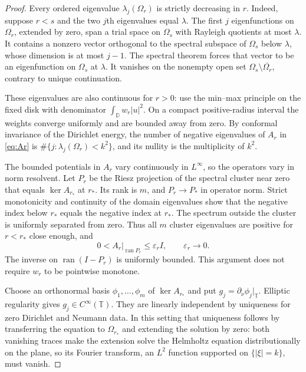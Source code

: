 \documentclass[11pt]{amsart}
\numberwithin{equation}{section}
\newcommand{\D}{\mathbb D}
\newcommand{\T}{\mathbb T}
\newcommand{\Id}{I}
\newcommand{\ran}{\operatorname{ran}}
\begin{document}
\begin{proof}
Every ordered eigenvalue $\lambda_j(\Omega_r)$ is strictly decreasing
in $r$. Indeed, suppose $r<s$ and the two $j$th eigenvalues equal
$\lambda$. The first $j$ eigenfunctions on $\Omega_r$, extended by
zero, span a trial space on $\Omega_s$ with Rayleigh quotients at
most $\lambda$. It contains a nonzero vector orthogonal to the
spectral subspace of $\Omega_s$ below $\lambda$, whose dimension is
at most $j-1$. The spectral theorem forces that vector to be an
eigenfunction on $\Omega_s$ at $\lambda$. It vanishes on the
nonempty open set $\Omega_s\setminus\overline{\Omega_r}$,
contrary to unique continuation.

These eigenvalues are also continuous for $r>0$: use the min--max
principle on the fixed disk with denominator
$\int_\D w_r|u|^2$. On a compact positive-radius interval the
weights converge uniformly and are bounded away from zero.
By conformal invariance of the Dirichlet energy, the number of
negative eigenvalues of $A_r$ in \eqref{eq:Ar} is
$\#\{j:\lambda_j(\Omega_r)<k^2\}$, and its nullity is the
multiplicity of $k^2$.

The bounded potentials in $A_r$ vary continuously in $L^\infty$,
so the operators vary in norm resolvent. Let $P_r$ be the Riesz
projection of the spectral cluster near zero that equals
$\ker A_{r_*}$ at $r_*$. Its rank is $m$, and $P_r\to P_*$ in
operator norm. Strict monotonicity and continuity of the domain
eigenvalues show that the negative index below $r_*$ equals the
negative index at $r_*$. The spectrum outside the cluster is
uniformly separated from zero. Thus all $m$ cluster eigenvalues
are positive for $r<r_*$ close enough, and
\[
 0<A_r|_{\ran P_r}\le\varepsilon_r\Id,
 \qquad \varepsilon_r\longrightarrow0.
\]
The inverse on $\ran(\Id-P_r)$ is uniformly bounded.
This argument does not require $w_r$ to be pointwise monotone.

Choose an orthonormal basis $\phi_1,\ldots,\phi_m$ of
$\ker A_{r_*}$ and put $g_j=\partial_\nu\phi_j|_\T$.
Elliptic regularity gives $g_j\in C^\infty(\T)$.
They are linearly independent by uniqueness for zero Dirichlet and
Neumann data. In this setting that uniqueness follows by transferring
the equation to $\Omega_{r_*}$ and extending the solution by zero: both
vanishing traces make the extension solve the Helmholtz equation
distributionally on the plane, so its Fourier transform, an $L^2$
function supported on $\{|\xi|=k\}$, must vanish.


\end{proof}
\end{document}
